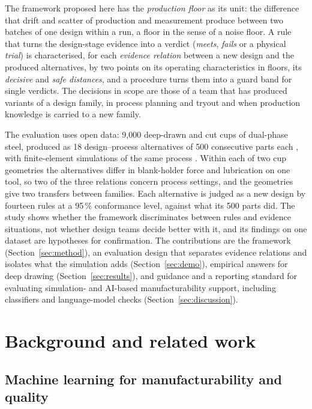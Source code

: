 \documentclass[pdflatex,sn-basic,lineno]{sn-jnl}
\begin{document}
The framework proposed here has the \emph{production floor} as its unit: the difference that drift and scatter of production and measurement produce between two batches of one design within a run, a floor in the sense of a noise floor. A rule that turns the design-stage evidence into a verdict (\emph{meets}, \emph{fails} or a physical \emph{trial}) is characterised, for each \emph{evidence relation} between a new design and the produced alternatives, by two points on its operating characteristics in floors, its \emph{decisive} and \emph{safe distances}, and a procedure turns them into a guard band for single verdicts. The decisions in scope are those of a team that has produced variants of a design family, in process planning and tryout and when production knowledge is carried to a new family.

The evaluation uses open data: 9,000 deep-drawn and cut cups of dual-phase steel, produced as 18 design--process alternatives of 500 consecutive parts each \citep{baum2026rddac}, with finite-element simulations of the same process \citep{baum2025ddacs}. Within each of two cup geometries the alternatives differ in blank-holder force and lubrication on one tool, so two of the three relations concern process settings, and the geometries give two transfers between families. Each alternative is judged as a new design by fourteen rules at a 95\,\% conformance level, against what its 500 parts did. The study shows whether the framework discriminates between rules and evidence situations, not whether design teams decide better with it, and its findings on one dataset are hypotheses for confirmation. The contributions are the framework (Section~\ref{sec:method}), an evaluation design that separates evidence relations and isolates what the simulation adds (Section~\ref{sec:demo}), empirical answers for deep drawing (Section~\ref{sec:results}), and guidance and a reporting standard for evaluating simulation- and AI-based manufacturability support, including classifiers and language-model checks (Section~\ref{sec:discussion}).

\section{Background and related work}\label{sec:background}

\subsection{Machine learning for manufacturability and quality}
\end{document}
